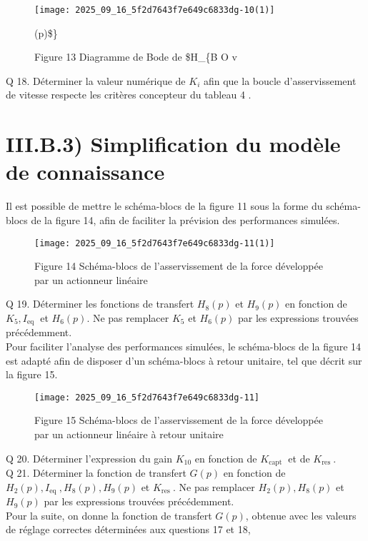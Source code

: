 \begin{figure}[h]
\begin{center}
  \texttt{[image: 2025\_09\_16\_5f2d7643f7e649c6833dg-10(1)]}
\captionsetup{labelformat=empty}
\caption{Figure 13 Diagramme de Bode de \$H\_\{B O v}(p)\$\}\end{center}
\end{figure}

Q 18. Déterminer la valeur numérique de $K_{i}$ afin que la boucle d'asservissement de vitesse respecte les critères concepteur du tableau 4 .

\section{III.B.3) Simplification du modèle de connaissance}
Il est possible de mettre le schéma-blocs de la figure 11 sous la forme du schéma-blocs de la figure 14, afin de faciliter la prévision des performances simulées.

\begin{figure}[h]
\begin{center}
  \texttt{[image: 2025\_09\_16\_5f2d7643f7e649c6833dg-11(1)]}
\captionsetup{labelformat=empty}
\caption{Figure 14 Schéma-blocs de l'asservissement de la force développée par un actionneur linéaire}
\end{center}
\end{figure}

Q 19. Déterminer les fonctions de transfert $H_{8}(p)$ et $H_{9}(p)$ en fonction de $K_{5}, I_{\text {eq }}$ et $H_{6}(p)$. Ne pas remplacer $K_{5}$ et $H_{6}(p)$ par les expressions trouvées précédemment.\\
Pour faciliter l'analyse des performances simulées, le schéma-blocs de la figure 14 est adapté afin de disposer d'un schéma-blocs à retour unitaire, tel que décrit sur la figure 15.

\begin{figure}[h]
\begin{center}
  \texttt{[image: 2025\_09\_16\_5f2d7643f7e649c6833dg-11]}
\captionsetup{labelformat=empty}
\caption{Figure 15 Schéma-blocs de l'asservissement de la force développée par un actionneur linéaire à retour unitaire}
\end{center}
\end{figure}

Q 20. Déterminer l'expression du gain $K_{10}$ en fonction de $K_{\text {capt }}$ et de $K_{\text {res }}$.\\
Q 21. Déterminer la fonction de transfert $G(p)$ en fonction de $H_{2}(p), I_{\text {eq }}, H_{8}(p), H_{9}(p)$ et $K_{\text {res }}$. Ne pas remplacer $H_{2}(p), H_{8}(p)$ et $H_{9}(p)$ par les expressions trouvées précédemment.\\
Pour la suite, on donne la fonction de transfert $G(p)$, obtenue avec les valeurs de réglage correctes déterminées aux questions 17 et 18,

